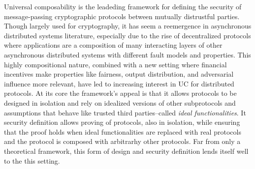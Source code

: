 
Universal composability is the leadeding framework for defining the security of message-passing cryptographic protocols between mutually distrustful parties.
Though largely used for cryptography, it has seem a reemergence in asynchronous distributed systems literature, especially due to the rise of decentralized protocols where applications are a composition of many interacting layers of other asynchronous distributed systems with different fault models and properties.
This highly compositional nature, combined with a new setting where financial incentives make properties like fairness, output distribution, and adversarial influence more relevant, have led to increasing interest in UC for distributed protocols.
At its core the framework's appeal is that it allows protocols to be designed in isolation and rely on idealized versions of other subprotocols and assumptions that behave like trusted third parties--called \emph{ideal functionalities}. 
It security definition allows proving of protocols, also in isolation, while ensuring that the proof holds when ideal functionalities are replaced with real protocols and the protocol is composed with arbitrarhy other protocols. 
Far from only a theoretical framework, this form of design and security definition lends itself well to the this setting.

